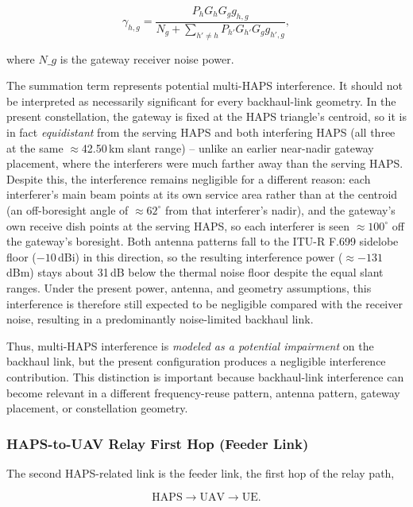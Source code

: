 \documentclass[conference]{IEEEtran}
\begin{document}
\begin{equation}
\gamma_{h,g}=\frac{P_h G_h G_g g_{h,g}}{N_g + \displaystyle\sum_{h'\neq h}P_{h'}G_{h'}G_g g_{h',g}},
\label{eq:feeder-sinr}
\end{equation}

where $N\_g$ is the gateway receiver noise power.

The summation term represents potential multi-HAPS interference. It should not be interpreted as necessarily significant for every backhaul-link geometry. In the present constellation, the gateway is fixed at the HAPS triangle's centroid, so it is in fact \emph{equidistant} from the serving HAPS and both interfering HAPS (all three at the same $\approx$42.50\,km slant range) -- unlike an earlier near-nadir gateway placement, where the interferers were much farther away than the serving HAPS. Despite this, the interference remains negligible for a different reason: each interferer's main beam points at its own service area rather than at the centroid (an off-boresight angle of $\approx62^\circ$ from that interferer's nadir), and the gateway's own receive dish points at the serving HAPS, so each interferer is seen $\approx100^\circ$ off the gateway's boresight. Both antenna patterns fall to the ITU-R F.699 sidelobe floor ($-10$\,dBi) in this direction, so the resulting interference power ($\approx-131$\,dBm) stays about 31\,dB below the thermal noise floor despite the equal slant ranges. Under the present power, antenna, and geometry assumptions, this interference is therefore still expected to be negligible compared with the receiver noise, resulting in a predominantly noise-limited backhaul link.

Thus, multi-HAPS interference is \emph{modeled as a potential impairment} on the backhaul link, but the present configuration produces a negligible interference contribution. This distinction is important because backhaul-link interference can become relevant in a different frequency-reuse pattern, antenna pattern, gateway placement, or constellation geometry.

\subsubsection{HAPS-to-UAV Relay First Hop (Feeder Link)}

The second HAPS-related link is the feeder link, the first hop of the relay path,

\begin{equation}
\mathrm{HAPS}\rightarrow\mathrm{UAV}\rightarrow\mathrm{UE}.
\end{equation}
\end{document}
